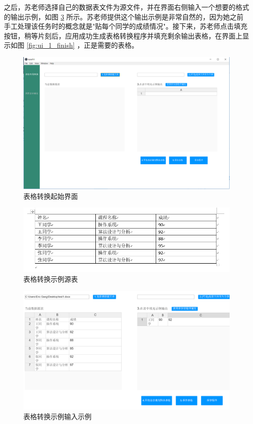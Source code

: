 \documentclass[design, pageheader]{njubachelor}
\begin{document}
之后，苏老师选择自己的数据表文件为源文件，并在界面右侧输入一个想要的格式的输出示例，如图 \ref{fig:ui_1_input} 所示。苏老师提供这个输出示例是非常自然的，因为她之前手工处理该任务时的概念就是"贴每个同学的成绩情况"。接下来，苏老师点击填充按钮，稍等片刻后，应用成功生成表格转换程序并填充剩余输出表格，在界面上显示如图 \ref{fig:ui_1_finish} ，正是需要的表格。
\begin{figure}[!htbp]
    \centering
    \includegraphics[width=15cm,keepaspectratio]{figures/ui_1_init.png}
    \caption{表格转换起始界面}
    \label{fig:ui_1_init}
\end{figure}
\begin{figure}[!htbp]
    \centering
    \includegraphics[width=15cm,keepaspectratio]{figures/docx_file.png}
    \caption{表格转换示例源表}
    \label{fig:docx_file}
\end{figure}
\begin{figure}[!htbp]
    \centering
    \includegraphics[width=15cm,keepaspectratio]{figures/ui_1_input.png}
    \caption{表格转换示例输入示例}
    \label{fig:ui_1_input}
\end{figure}
\end{document}

